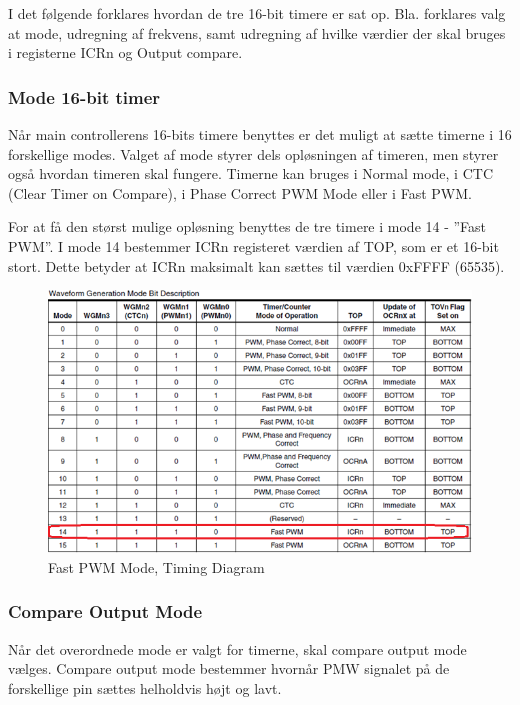 \newpage

I det følgende forklares hvordan de tre 16-bit timere er sat op. Bla. forklares valg at mode, udregning af frekvens, samt udregning af hvilke værdier der skal bruges i registerne ICRn og Output compare.

\subsubsection*{Mode 16-bit timer}

Når main controllerens 16-bits timere benyttes er det muligt at sætte timerne i 16 forskellige modes. Valget af mode styrer dels opløsningen af timeren, men styrer også hvordan timeren skal fungere. Timerne kan bruges i Normal mode, i CTC (Clear Timer on Compare), i Phase Correct PWM Mode eller i Fast PWM.

For at få den størst mulige opløsning benyttes de tre timere i mode 14 - ”Fast PWM”. I mode 14 bestemmer ICRn registeret værdien af TOP, som er et 16-bit stort. Dette betyder at ICRn maksimalt kan sættes til værdien 0xFFFF (65535). 

\begin{figure}[H]
	\centering
	\includegraphics[width=1.\textwidth]{Billeder/Timer/1_mode.png}
	\caption{Fast PWM Mode, Timing Diagram}
	\label{fig:Timing_diagram}
\end{figure}

\newpage

\subsubsection*{Compare Output Mode}
Når det overordnede mode er valgt for timerne, skal compare output mode vælges. Compare output mode bestemmer hvornår PMW signalet på de forskellige pin sættes helholdvis højt og lavt.

